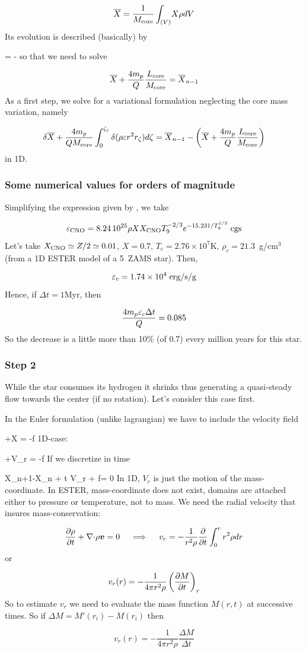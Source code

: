 \[ \overline{X} = \frac{1}{M_{\rm core}}\int_{(V)}\! X\rho dV\]
Its evolution is described (basically) by

\beq \dnt{\Xb} = -\eeq
so that we need to solve

\[ \overline{X} + \frac{4m_p}{Q}\frac{L_{\rm core}}{M_{\rm core}} = \overline{X}_{n-1}\]
As a first step, we solve for a  variational formulation neglecting the core
mass variation, namely

\[ \delta\overline{X} + \frac{4m_p}{QM_{\rm core}}\int_0^{\zeta_c} \delta(\rho\varepsilon r^2r_\zeta)d\zeta
= \overline{X}_{n-1} -\left(\overline{X} + \frac{4m_p}{Q}\frac{L_{\rm core}}{M_{\rm core}}\right)\]
in 1D.

\subsubsection{Some numerical values for orders of magnitude}

Simplifying the expression given by \cite{KWW12}, we take 

\[ \varepsilon_{\rm CNO} = 8.24\, 10^{25} \rho X X_{\rm CNO} T_9^{-2/3}
e^{-15.231/T_9^{1/3}}\; {\rm cgs}\]
Let's take $X_{\rm CNO}\simeq Z/2 \simeq 0.01$, $X=0.7$,
$T_c=2.76\times10^7$K, $\rho_c=21.3$~g/cm$^3$ (from a 1D ESTER model of
a 5\msun\ ZAMS star). Then,

\[ \varepsilon_c = 1.74\times10^4\; {\rm erg/s/g}\]
Hence, if $\Delta t=1$Myr, then

\[ \frac{4m_p\varepsilon_c\Delta t}{Q} = 0.085\]
So the decrease is a little more than 10\% (of 0.7) every million years
for this star.


\subsubsection{Step 2}

While the star consumes its hydrogen it shrinks thus generating a
quasi-steady flow towards the center (if no rotation). Let's consider
this case first. 

In the Euler formulation (unlike lagrangian) we have to include the
velocity field

\beq {}+\vv\cdot\na X = -f \eps \eeq
1D-case:

\beq {}+V_r = -f\eps\eeq
If we discretize in time

\beq X_{n+1}-X_n + \Delta t V_r  + f\eps = 0 \eeq
In 1D, $V_r$ is just the motion of the mass-coordinate. In ESTER,
mass-coordinate does not exist, domains are attached either to
pressure or temperature, not to mass. We need the radial velocity that
insures mass-conservation:

\[ \dt{\rho}+\Div\rho\vv=0 \quad \impl \quad v_r=-\frac{1}{r^2\rho}\dt{}
\int_0^rr^2\rho dr\]
or

\[ v_r(r) = -\frac{1}{4\pi r^2\rho}\left(\frac{\partial M}{\partial t}\right)_r\]
So to estimate $v_r$ we need to evaluate the mass function $M(r,t)$ at
successive times. So if $\Delta M = M'(r_i)-M(r_i)$ then

\[ v_r(r) = -\frac{1}{4\pi r^2\rho}\frac{\Delta M}{\Delta t}\]
